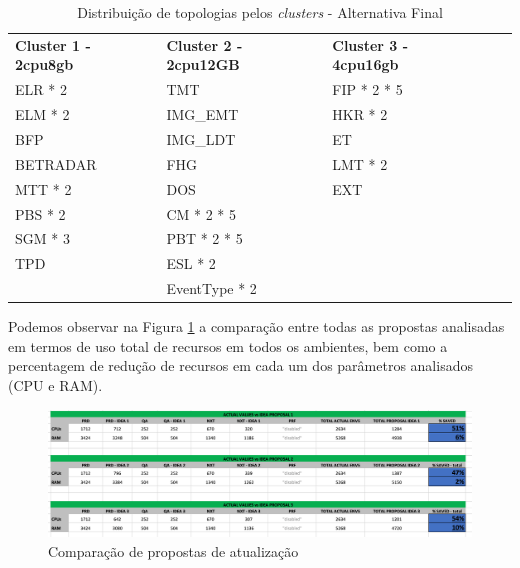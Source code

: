 \begin{table}[h!]
  \centering
  \begin{tabular}{|l|l|l|l|l|}
    \hline
    \rowcolor[HTML]{FBE6A3} 
    \multicolumn{3}{|c|}{\textbf{Alternativa Final}} \\ \hline
    \rowcolor[HTML]{4EAC5B} 
     \textbf{Cluster 1 - 2cpu8gb} & \textbf{Cluster 2 - 2cpu12GB} & \textbf{Cluster 3 - 4cpu16gb}  \\ \hline
     \cellcolor[HTML]{A9D08E} ELR * 2 & \cellcolor[HTML]{BDD7EE} TMT  & \cellcolor[HTML]{A9D08E} FIP * 2 * 5  \\ \hline
     \cellcolor[HTML]{A9D08E} ELM * 2 & \cellcolor[HTML]{BDD7EE} IMG\_EMT  & \cellcolor[HTML]{A9D08E} HKR * 2 \\ \hline
     \cellcolor[HTML]{A9D08E} BFP & \cellcolor[HTML]{BDD7EE} IMG\_LDT  & \cellcolor[HTML]{BDD7EE} ET  \\ \hline
     \cellcolor[HTML]{A9D08E} BETRADAR & \cellcolor[HTML]{BDD7EE} FHG  & \cellcolor[HTML]{BDD7EE} LMT * 2  \\ \hline
     \cellcolor[HTML]{BDD7EE} MTT * 2 & \cellcolor[HTML]{BDD7EE} DOS  & \cellcolor[HTML]{BDD7EE} EXT  \\ \hline
     \cellcolor[HTML]{BDD7EE} PBS * 2 & \cellcolor[HTML]{BDD7EE} CM * 2 * 5  & \cellcolor{white}  \\ \hline
     \cellcolor[HTML]{BDD7EE} SGM * 3 & \cellcolor[HTML]{A9D08E} PBT * 2 * 5  & \cellcolor{white} \\ \hline
     \cellcolor[HTML]{BDD7EE} TPD & \cellcolor[HTML]{A9D08E} ESL * 2 & \cellcolor{white} \\ \hline
     \cellcolor{white} & \cellcolor[HTML]{A9D08E} EventType * 2 & \cellcolor{white}  \\ \hline

  \end{tabular}
  \caption{Distribuição de topologias pelos \textit{clusters} - Alternativa Final}
  \label{tab:proposal-final}
\end{table}

Podemos observar na Figura \ref{comparison-proposal} a comparação entre todas as propostas
analisadas em termos de uso total de recursos em todos os ambientes, bem como a percentagem de 
redução de recursos em cada um dos parâmetros analisados (CPU e RAM).

\begin{figure}[H]
  \centerline{\includegraphics[scale=0.4]{media/content/analise/proposal-comparison.png}}
  \caption{Comparação de propostas de atualização}
  \label{comparison-proposal}
\end{figure}

